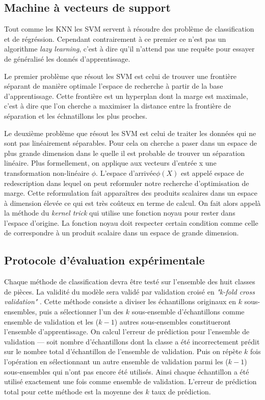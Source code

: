        
        \subsection{Machine à vecteurs de support}
        
        Tout comme les KNN les SVM servent à résoudre des problème de classification et de régréssion.
        Cependant contrairement à ce premier ce n'est pas un algorithme \emph{lazy learning}, c'est à dire qu'il n'attend pas une requête pour essayer de généralisé les donnés d'apprentissage.
        
        Le premier problème que résout les SVM est celui de trouver une frontière séparant de manière optimale l'espace de recherche à partir de la base d'apprentissage.
        Cette frontière est un hyperplan dont la marge est maximale, c'est à dire que l'on cherche a maximiser la distance entre la frontière de séparation et les échnatillons les plus proches.
        
        Le deuxième problème que résout les SVM est celui de traiter les données qui ne sont pas linéairement séparables.
        Pour cela on cherche a paser dans un espace de plus grande dimension dans le quelle il est probable de trouver un séparation linéaire.
        Plus formellement, on applique aux vecteurs d'entrée x une transformation non-linéaire $\phi$.
        L'espace d'arrivée$\phi (X)$ est appelé espace de redescription dans lequel on peut reformuler notre recherche d'optimisation de marge.
        Cette reformulation fait apparaîtres des produits scalaires dans un espace à dimension élevée ce qui est très coûteux en terme de calcul.
        On fait alors appelà la méthode du \emph{kernel trick} qui utilise une fonction noyau pour rester dans l'espace d'origine.
        La fonction noyau doit respecter certain condition comme celle de correspondre à un produit scalaire dans un espace de grande dimension.
        
        
        \subsection{Protocole d'évaluation expérimentale}

        Chaque méthode de classification devra être testé sur l'ensemble des huit classes de pièces.
        La validité du modèle sera validé par validation croisé en \emph{"k-fold cross validation"} \cite{Refaeilzadeh2009}.
        Cette méthode consiste a diviser les échantillons originaux en $k$ sous-ensembles, puis a sélectionner l'un des $k$ sous-ensemble d'échantillons comme ensemble de validation et les ($k-1$) autres sous-ensembles constitueront l'ensemble d'apprentissage.
        On calcul l'erreur de prédiction pour l'ensemble de validation --- soit nombre d'échantillons dont la classe a été incorrectement prédit sur le nombre total d'échantillon de l'ensemble de validation.
        Puis on répète $k$ fois l'opération en sélectionnant un autre ensemble de validation parmi les ($k-1$) sous-ensembles qui n'ont pas encore été utilisés.
        Ainsi chaque échantillon a été utilisé exactement une fois comme ensemble de validation.
        L'erreur de prédiction total pour cette méthode est la moyenne des $k$ taux de prédiction.
        
